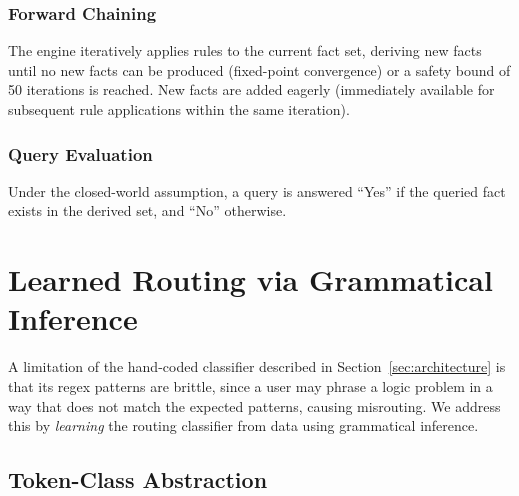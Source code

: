 \documentclass[journal]{IEEEtai}
\begin{document}
\subsubsection{Forward Chaining} The engine iteratively applies rules to the current fact set, deriving new facts until no new facts can be produced (fixed-point convergence) or a safety bound of 50 iterations is reached. New facts are added eagerly (immediately available for subsequent rule applications within the same iteration).

\subsubsection{Query Evaluation} Under the closed-world assumption, a query is answered ``Yes'' if the queried fact exists in the derived set, and ``No'' otherwise.

\section{Learned Routing via Grammatical Inference}
\label{sec:gi}

A limitation of the hand-coded classifier described in Section~\ref{sec:architecture} is that its regex patterns are brittle, since a user may phrase a logic problem in a way that does not match the expected patterns, causing misrouting. We address this by \emph{learning} the routing classifier from data using grammatical inference.

\subsection{Token-Class Abstraction}
\label{sec:token_abstraction}
\end{document}

